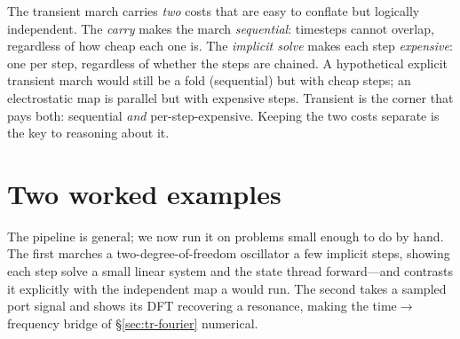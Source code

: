\begin{notationbox}
The transient march carries \emph{two} costs that are easy to conflate but logically
independent. The \emph{carry} makes the march \emph{sequential}: timesteps cannot
overlap, regardless of how cheap each one is. The \emph{implicit solve} makes each
step \emph{expensive}: one  per step, regardless of whether the
steps are chained. A hypothetical explicit transient march would still be a fold
(sequential) but with cheap steps; an electrostatic map is parallel but with
expensive steps. Transient is the corner that pays both: sequential \emph{and}
per-step-expensive. Keeping the two costs separate is the key to reasoning about it.
\end{notationbox}

\section{Two worked examples}
\label{sec:tr-worked}

The pipeline is general; we now run it on problems small enough to do by hand. The
first marches a two-degree-of-freedom oscillator a few implicit steps, showing each
step solve a small linear system and the state thread forward---and contrasts it
explicitly with the independent map a  would run. The second
takes a sampled port signal and shows its DFT recovering a resonance, making the
time$\to$frequency bridge of \S\ref{sec:tr-fourier} numerical.

